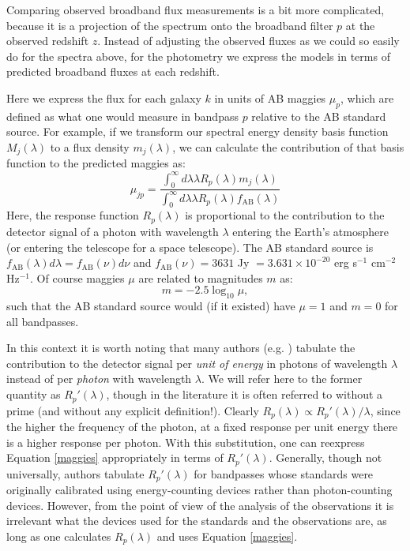 \documentclass[12pt,preprint]{aastex}
\begin{document}
Comparing observed broadband flux measurements is a bit more
complicated, because it is a projection of the spectrum onto the
broadband filter $p$ at the observed redshift $z$. Instead of
adjusting the observed fluxes as we could so easily do for the spectra
above, for the photometry we express the models in terms of predicted
broadband fluxes at each redshift.

Here we express the flux for each galaxy $k$ in units of AB maggies
$\mu_p$, which are defined as what one would measure in bandpass $p$
relative to the AB standard source. For example, if we transform our
spectral energy density basis function $M_{j}(\lambda)$ to a flux
density $m_{j}(\lambda)$, we can calculate the contribution of
that basis function to the predicted maggies as:
\begin{equation}
\label{maggies}
\mu_{jp} = 
\frac{\int_0^{\infty} d\lambda \lambda R_p(\lambda) {m}_{j}(\lambda)}
{\int_0^\infty d\lambda \lambda R_p(\lambda) f_{\mathrm{AB}}(\lambda) }
\end{equation}
Here, the response function $R_p(\lambda)$ is proportional to the
contribution to the detector signal of a photon with wavelength
$\lambda$ entering the Earth's atmosphere (or entering the telescope
for a space telescope). The AB standard source is $f_{
\mathrm{AB}}(\lambda) d\lambda = f_{
\mathrm{AB}} (\nu) d\nu$ and $f_{\mathrm{AB}}(\nu)=3631$ Jy $= 3.631 \times
10^{-20}$ erg s$^{-1}$ cm$^{-2}$ Hz$^{-1}$. Of course maggies $\mu$
are related to magnitudes $m$ as:
\begin{equation}
m = -2.5 \log_{10} \mu, 
\end{equation}
such that the AB standard source would (if it existed) have $\mu=1$
and $m=0$ for all bandpasses.

In this context it is worth noting that many authors
(e.g. \citealt{bessell90a}) tabulate the contribution to the detector
signal per {\it unit of energy} in photons of wavelength $\lambda$
instead of per {\it photon} with wavelength $\lambda$.  We will refer here
to the former quantity as $R_p'(\lambda)$, though in the literature it is
often referred to without a prime (and without any explicit
definition!). Clearly $R_p(\lambda) \propto R_p'(\lambda)/\lambda$,
since the higher the frequency of the photon, at a fixed response per
unit energy there is a higher response per photon. With this
substitution, one can reexpress Equation
\ref{maggies} appropriately in terms of $R_p'(\lambda)$.  
Generally, though not universally, authors tabulate $R_p'(\lambda)$
for bandpasses whose standards were originally calibrated using
energy-counting devices rather than photon-counting devices. However,
from the point of view of the analysis of the observations it is
irrelevant what the devices used for the standards and the
observations are, as long as one calculates $R_p(\lambda)$ and uses
Equation \ref{maggies}.  
\end{document}
